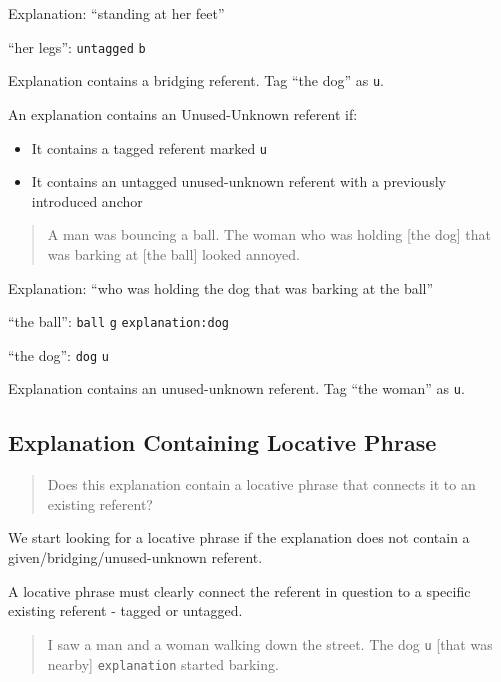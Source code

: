 \documentclass[
]{book}
\providecommand{\tightlist}{%
  \setlength{\itemsep}{0pt}\setlength{\parskip}{0pt}}
\begin{document}
Explanation: ``standing at her feet''

``her legs'': \texttt{untagged} \texttt{b}

Explanation contains a bridging referent.
Tag ``the dog'' as \texttt{u}.

An explanation contains an Unused-Unknown referent if:

\begin{itemize}
\tightlist
\item
  It contains a tagged referent marked \texttt{u}
\item
  It contains an untagged unused-unknown referent with a previously introduced anchor
\end{itemize}

\begin{quote}
A man was bouncing a ball.
The woman who was holding {[}the dog{]} that was barking at {[}the ball{]}
looked annoyed.
\end{quote}

Explanation: ``who was holding the dog that was barking at the ball''

``the ball'': \texttt{ball} \texttt{g} \texttt{explanation:dog}

``the dog'': \texttt{dog} \texttt{u}

Explanation contains an unused-unknown referent.
Tag ``the woman'' as \texttt{u}.

\hypertarget{explanation-containing-locative-phrase}{%
\subsection{Explanation Containing Locative Phrase}\label{explanation-containing-locative-phrase}}

\begin{quote}
Does this explanation contain a locative phrase
that connects it to an existing referent?
\end{quote}

We start looking for a locative phrase if
the explanation does not contain a given/bridging/unused-unknown referent.

A locative phrase must clearly connect the referent in question
to a specific existing referent - tagged or untagged.

\begin{quote}
I saw a man and a woman walking down the street.
The dog \texttt{u} {[}that was nearby{]} \texttt{explanation} started barking.
\end{quote}
\end{document}
